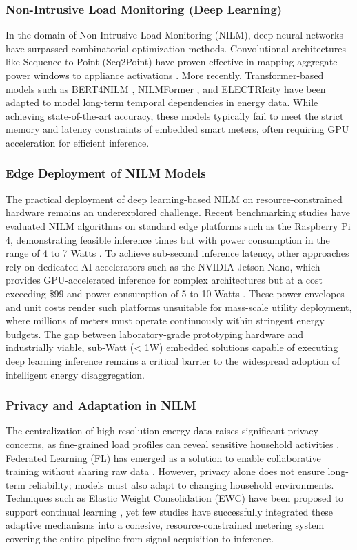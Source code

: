 \documentclass[fleqn,10pt]{wlscirep}
\begin{document}
\subsubsection{Non-Intrusive Load Monitoring (Deep Learning)}
In the domain of Non-Intrusive Load Monitoring (NILM), deep neural networks have surpassed combinatorial optimization methods. Convolutional architectures like Sequence-to-Point (Seq2Point) have proven effective in mapping aggregate power windows to appliance activations \cite{Zhang2018}. More recently, Transformer-based models such as BERT4NILM \cite{Yue2020}, NILMFormer \cite{Sykiotis2024}, and ELECTRIcity \cite{Massidda2022} have been adapted to model long-term temporal dependencies in energy data. While achieving state-of-the-art accuracy, these models typically fail to meet the strict memory and latency constraints of embedded smart meters, often requiring GPU acceleration for efficient inference.

\subsubsection{Edge Deployment of NILM Models}
The practical deployment of deep learning-based NILM on resource-constrained hardware remains an underexplored challenge. Recent benchmarking studies have evaluated NILM algorithms on standard edge platforms such as the Raspberry Pi 4, demonstrating feasible inference times but with power consumption in the range of 4 to 7 Watts \cite{EdgeNILM2025}. To achieve sub-second inference latency, other approaches rely on dedicated AI accelerators such as the NVIDIA Jetson Nano, which provides GPU-accelerated inference for complex architectures but at a cost exceeding \$99 and power consumption of 5 to 10 Watts \cite{Xu2024VMD}. These power envelopes and unit costs render such platforms unsuitable for mass-scale utility deployment, where millions of meters must operate continuously within stringent energy budgets. The gap between laboratory-grade prototyping hardware and industrially viable, sub-Watt (< 1W) embedded solutions capable of executing deep learning inference remains a critical barrier to the widespread adoption of intelligent energy disaggregation.

\subsubsection{Privacy and Adaptation in NILM}
The centralization of high-resolution energy data raises significant privacy concerns, as fine-grained load profiles can reveal sensitive household activities \cite{MDPI2025}. Federated Learning (FL) has emerged as a solution to enable collaborative training without sharing raw data \cite{Li2024, SciRep2025}. However, privacy alone does not ensure long-term reliability; models must also adapt to changing household environments. Techniques such as Elastic Weight Consolidation (EWC) have been proposed to support continual learning \cite{Kirkpatrick2017}, yet few studies have successfully integrated these adaptive mechanisms into a cohesive, resource-constrained metering system covering the entire pipeline from signal acquisition to inference.
\end{document}
